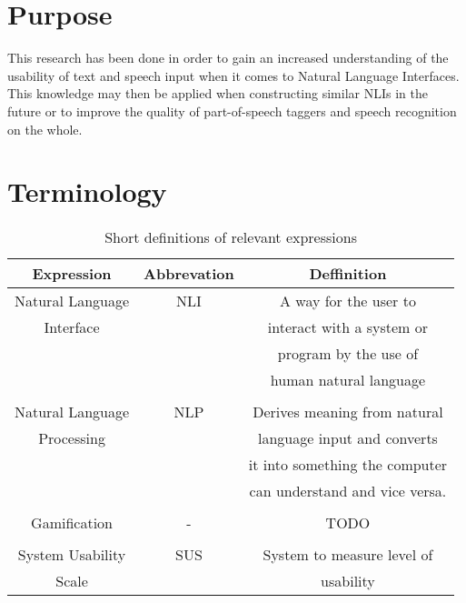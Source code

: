 \section{Purpose}
This research has been done in order to gain an increased understanding of the usability of text and speech input when it comes to Natural Language Interfaces. This knowledge may then be applied when constructing similar NLIs in the future or to improve the quality of part-of-speech taggers and speech recognition on the whole.


\section{Terminology}

\begin{table}[h!]
  \centering
  \begin{tabular}{ccc}
    \toprule
    Expression & Abbrevation & Deffinition\\
    \midrule
    Natural Language & NLI & A way for the user to\\
    Interface & & interact with a system or\\ 
    & & program by the use of\\
    & & human natural language\\
    \\
    Natural Language & NLP & Derives meaning from natural\\
    Processing & & language input and converts\\
    & & it into something the computer\\
    & & can understand and vice versa.\\
    \\
    Gamification & - & TODO \\
    \\
    System Usability & SUS & System to measure level of\\
    Scale & &  usability\\
    \bottomrule
  \end{tabular}
  \caption{Short definitions of relevant expressions}\label{termin}
\end{table}